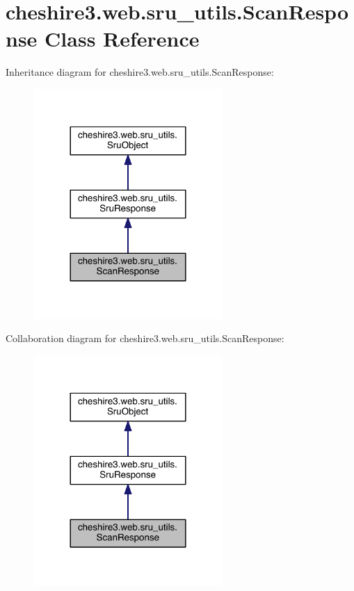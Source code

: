 \hypertarget{classcheshire3_1_1web_1_1sru__utils_1_1_scan_response}{\section{cheshire3.\-web.\-sru\-\_\-utils.\-Scan\-Response Class Reference}
\label{classcheshire3_1_1web_1_1sru__utils_1_1_scan_response}
}


Inheritance diagram for cheshire3.\-web.\-sru\-\_\-utils.\-Scan\-Response\-:
\nopagebreak
\begin{figure}[H]
\begin{center}
\leavevmode
\includegraphics[width=204pt]{classcheshire3_1_1web_1_1sru__utils_1_1_scan_response__inherit__graph}
\end{center}
\end{figure}


Collaboration diagram for cheshire3.\-web.\-sru\-\_\-utils.\-Scan\-Response\-:
\nopagebreak
\begin{figure}[H]
\begin{center}
\leavevmode
\includegraphics[width=204pt]{classcheshire3_1_1web_1_1sru__utils_1_1_scan_response__coll__graph}
\end{center}
\end{figure}
